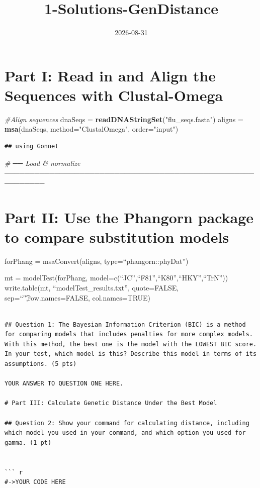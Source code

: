 \documentclass[
]{article}
\title{1-Solutions-GenDistance}
\author{}
\date{\vspace{-2.5em}2026-08-31}
\newenvironment{Shaded}{\begin{snugshade}}{\end{snugshade}}
\newcommand{\AttributeTok}[1]{\textcolor[rgb]{0.13,0.29,0.53}{#1}}
\newcommand{\CommentTok}[1]{\textcolor[rgb]{0.56,0.35,0.01}{\textit{#1}}}
\newcommand{\FunctionTok}[1]{\textcolor[rgb]{0.13,0.29,0.53}{\textbf{#1}}}
\newcommand{\NormalTok}[1]{#1}
\newcommand{\OtherTok}[1]{\textcolor[rgb]{0.56,0.35,0.01}{#1}}
\newcommand{\StringTok}[1]{\textcolor[rgb]{0.31,0.60,0.02}{#1}}
\begin{document}
\maketitle

\section{Part I: Read in and Align the Sequences with
Clustal-Omega}\label{part-i-read-in-and-align-the-sequences-with-clustal-omega}

\begin{Shaded}
\begin{Highlighting}[]
\CommentTok{\#Align sequences}
\NormalTok{dnaSeqs }\OtherTok{=} \FunctionTok{readDNAStringSet}\NormalTok{(}\StringTok{"flu\_seqs.fasta"}\NormalTok{)}
\NormalTok{aligns }\OtherTok{=} \FunctionTok{msa}\NormalTok{(dnaSeqs, }\AttributeTok{method=}\StringTok{"ClustalOmega"}\NormalTok{, }\AttributeTok{order=}\StringTok{"input"}\NormalTok{)}
\end{Highlighting}
\end{Shaded}

\begin{verbatim}
## using Gonnet
\end{verbatim}

\begin{Shaded}
\begin{Highlighting}[]
\CommentTok{\# ── Load \& normalize ──────────────────────────────────────────────────────────}
\end{Highlighting}
\end{Shaded}

\section{Part II: Use the Phangorn package to compare substitution
models}\label{part-ii-use-the-phangorn-package-to-compare-substitution-models}

forPhang = msaConvert(aligns, type=``phangorn::phyDat'')

mt = modelTest(forPhang,
model=c(``JC'',``F81'',``K80'',``HKY'',``TrN'')) write.table(mt,
``modelTest\_results.txt'', quote=FALSE, sep=``\t",row.names=FALSE,
col.names=TRUE)

\begin{verbatim}

## Question 1: The Bayesian Information Criterion (BIC) is a method for comparing models that includes penalties for more complex models. With this method, the best one is the model with the LOWEST BIC score. In your test, which model is this? Describe this model in terms of its assumptions. (5 pts)

YOUR ANSWER TO QUESTION ONE HERE.

# Part III: Calculate Genetic Distance Under the Best Model

## Question 2: Show your command for calculating distance, including which model you used in your command, and which option you used for gamma. (1 pt)


``` r
#->YOUR CODE HERE
\end{verbatim}
\end{document}
